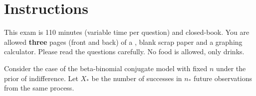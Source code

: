 \documentclass[12pt,landscape]{article}
\begin{document}
\section*{Instructions}
This exam is 110 minutes (variable time per question) and closed-book. You are allowed \textbf{three} pages (front and back) of a , blank scrap paper and a graphing calculator. Please read the questions carefully. No food is allowed, only drinks. %

\pagebreak



\problem{} Consider the case of the beta-binomial conjugate model with fixed $n$ under the prior of indifference. Let $X_*$ be the number of successes in $n_*$ future observations from the same process.

\vspace{-0.2cm}\benum{} 
\end{document}
